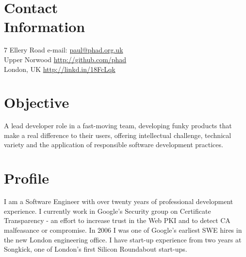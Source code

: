 \documentclass[line]{resume}
\begin{document}
\begin{resume}

    \section{\mysidestyle Contact\\Information}

    7 Ellery Road                          \hfill e-mail: \url{paul@phad.org.uk}            \vspace{0mm}\\\vspace{0mm}%
    Upper Norwood                          \hfill \url{http://github.com/phad}              \vspace{0mm}\\\vspace{0mm}%
    London, UK                             \hfill \url{http://linkd.in/18FcLqk}          \vspace{0mm}\\\vspace{-4.5mm}%

    \section{\mysidestyle Objective}

    A lead developer role in a fast-moving team, developing funky products that make a real difference to their users,
    offering intellectual challenge, technical variety and the application of responsible software development
    practices.

    \section{\mysidestyle Profile}

    I am a Software Engineer with over twenty years of professional development experience.  I currently work in
    Google's Security group on Certificate Transparency - an effort to increase trust in the Web PKI and to detect CA
    malfeasance or compromise.  In 2006 I was one of Google's earliest SWE hires in the new London engineering office.
    I have start-up experience from two years at Songkick, one of London's first Silicon Roundabout start-ups.


\end{resume}
\end{document}

